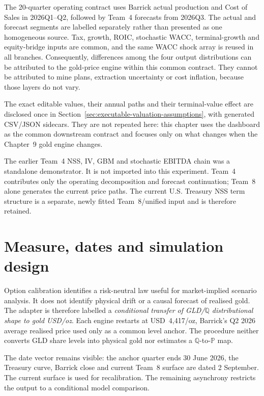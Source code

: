 The 20-quarter operating contract uses Barrick actual production and Cost of
Sales in 2026Q1--Q2, followed by Team~4 forecasts from 2026Q3. The actual and
forecast segments are labelled separately rather than presented as one
homogeneous source. Tax, growth, ROIC, stochastic WACC, terminal-growth and
equity-bridge inputs are common, and the same WACC shock array is reused in all
branches. Consequently, differences among the four output distributions can
be attributed to the gold-price engine within this common contract. They
cannot be attributed to mine plans, extraction uncertainty or cost inflation,
because those layers do not vary.

The exact editable values, their annual paths and their terminal-value effect
are disclosed once in Section~\ref{sec:executable-valuation-assumptions}, with
generated CSV/JSON sidecars. They are not repeated here: this chapter uses the
dashboard as the common downstream contract and focuses only on what changes
when the Chapter~9 gold engine changes.

The earlier Team~4 NSS, IV, GBM and stochastic EBITDA chain was a standalone
demonstrator. It is not imported into this experiment. Team~4 contributes only
the operating decomposition and forecast continuation; Team~8 alone generates
the current price paths. The current U.S. Treasury NSS term structure is a separate,
newly fitted Team~8/unified input and is therefore retained.

\section{Measure, dates and simulation design}

Option calibration identifies a risk-neutral law useful for market-implied
scenario analysis. It does not identify physical drift or a causal forecast of
realised gold. The adapter is therefore labelled a \emph{conditional transfer
of GLD/\(\mathbb Q\) distributional shape to gold USD/oz}. Each engine
restarts at USD~4,417/oz, Barrick's Q2 2026 average realised price used only
as a common level anchor. The procedure neither
converts GLD share levels into physical gold nor estimates a
\(\mathbb Q\)-to-\(\mathbb P\) map.

The date vector remains visible: the anchor quarter ends 30 June 2026, the
Treasury curve, Barrick close and current Team~8 surface are dated 2 September. The current surface is used for recalibration. The
remaining asynchrony restricts
the output to a conditional model comparison.

